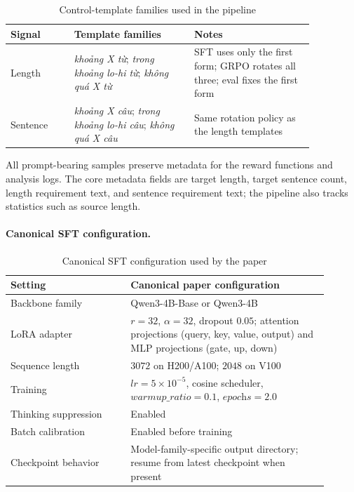 \documentclass[11pt]{article}
\newcommand{\vn}[1]{{\vietfont #1}}
\begin{document}
\begin{table}[H]
\centering
\caption{Control-template families used in the pipeline}
\label{tab:appendix-template-families}
\small
\begin{tabular}{L{0.18\linewidth}L{0.34\linewidth}L{0.34\linewidth}}
\toprule
Signal & Template families & Notes \\
\midrule
Length & \textit{\vn{khoảng X từ}}; \textit{\vn{trong khoảng lo-hi từ}}; \textit{\vn{không quá X từ}} & SFT uses only the first form; GRPO rotates all three; eval fixes the first form \\
Sentence & \textit{\vn{khoảng X câu}}; \textit{\vn{trong khoảng lo-hi câu}}; \textit{\vn{không quá X câu}} & Same rotation policy as the length templates \\
\bottomrule
\end{tabular}
\end{table}

All prompt-bearing samples preserve metadata for the reward functions and analysis logs.
The core metadata fields are target length, target sentence count, length requirement text, and sentence requirement text; the pipeline also tracks statistics such as source length.

\paragraph{Canonical SFT configuration.}
\begin{table}[H]
\centering
\caption{Canonical SFT configuration used by the paper}
\label{tab:appendix-sft-config}
\small
\begin{tabular}{L{0.34\linewidth}L{0.56\linewidth}}
\toprule
Setting & Canonical paper configuration \\
\midrule
Backbone family & Qwen3-4B-Base or Qwen3-4B \\
LoRA adapter & $r = 32$, $\alpha = 32$, dropout $0.05$; attention projections (query, key, value, output) and MLP projections (gate, up, down) \\
Sequence length & $3072$ on H200/A100; $2048$ on V100 \\
Training & $\mathit{lr} = 5\times10^{-5}$, cosine scheduler, $\mathit{warmup\_ratio} = 0.1$, $\textit{epochs} = 2.0$ \\
Thinking suppression & Enabled \\
Batch calibration & Enabled before training \\
Checkpoint behavior & Model-family-specific output directory; resume from latest checkpoint when present \\
\bottomrule
\end{tabular}
\end{table}
\end{document}
